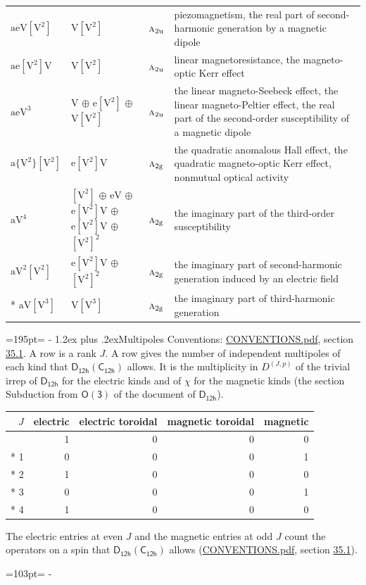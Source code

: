 \documentclass[10pt,a4paper]{article}
\makeatletter
\renewcommand\section{\@startsection{section}{1}{\z@}{-3ex plus -1ex minus -.2ex}%
  {1.2ex plus .2ex}{\normalfont\large\sffamily\bfseries\color{parttitle}}}
\newcommand{\needspace}[1]{\par\penalty-100\begingroup\dimen0=#1\relax\dimen2=\pagegoal
  \advance\dimen2-\pagetotal\ifdim\dimen0>\dimen2\relax\ifdim\dimen2>0pt\vfil\break\fi\fi
  \endgroup}
\numberwithin{equation}{section}
\newcommand{\grp}[1]{\mathsf{#1}}
\newcommand{\irr}[1]{\text{\normalfont\scshape #1}}
\newcommand{\ptag}[1]{\mathrm{#1}}
\newcommand{\irrJp}[2]{D^{(#1,#2)}}
\newcommand{\jahn}[1]{\mathrm{#1}}
\newlength{\fillwidth}\newlength{\cellwidth}\newlength{\colwidth}
\makeatother
\begin{document}
{\begin{longtable}{@{}lll>{\RaggedRight\arraybackslash}p{\fillwidth}@{}}
$\jahn{aeV[V^{2}]}$ & $\jahn{V[V^{2}]}$ & $\irr{a}_{2\ptag{u}}$ & piezomagnetism, the real part of second-harmonic generation by a magnetic dipole\\
$\jahn{ae[V^{2}]V}$ & $\jahn{V[V^{2}]}$ & $\irr{a}_{2\ptag{u}}$ & linear magnetoresistance, the magneto-optic Kerr effect\\
$\jahn{aeV^{3}}$ & $\jahn{V}$ $\oplus$ $\jahn{e[V^{2}]}$ $\oplus$ $\jahn{V[V^{2}]}$ & $\irr{a}_{2\ptag{u}}$ & the linear magneto-Seebeck effect, the linear magneto-Peltier effect, the real part of the second-order susceptibility of a magnetic dipole\\
$\jahn{a\{V^{2}\}[V^{2}]}$ & $\jahn{e[V^{2}]V}$ & $\irr{a}_{2\ptag{g}}$ & the quadratic anomalous Hall effect, the quadratic magneto-optic Kerr effect, nonmutual optical activity\\
$\jahn{aV^{4}}$ & $\jahn{[V^{2}]}$ $\oplus$ $\jahn{eV}$ $\oplus$ $\jahn{e[V^{2}]V}$ $\oplus$ $\jahn{e[V^{2}]V}$ $\oplus$ $\jahn{[V^{2}]^{2}}$ & $\irr{a}_{2\ptag{g}}$ & the imaginary part of the third-order susceptibility\\
$\jahn{aV^{2}[V^{2}]}$ & $\jahn{e[V^{2}]V}$ $\oplus$ $\jahn{[V^{2}]^{2}}$ & $\irr{a}_{2\ptag{g}}$ & the imaginary part of second-harmonic generation induced by an electric field\\*
$\jahn{aV[V^{3}]}$ & $\jahn{V[V^{3}]}$ & $\irr{a}_{2\ptag{g}}$ & the imaginary part of third-harmonic generation\\
\bottomrule\end{longtable}}
\needspace{195pt}
\section{Multipoles}\label{s:multipoles}
Conventions: \href{../../CONVENTIONS.pdf}{CONVENTIONS.pdf}, section \href{../../CONVENTIONS.pdf\#conv.35.1}{35.1}.
A row is a rank $J$. \label{n:head.multipole.electric}\label{n:head.multipole.electric.toroidal}\label{n:head.multipole.magnetic.toroidal}\label{n:head.multipole.magnetic}A row gives the number of independent multipoles of each kind that $\grp{D_{12h}}(\grp{C_{12h}})$ allows. It is the multiplicity in $\irrJp{J}{p}$ of the trivial irrep of $\grp{D_{12h}}$ for the electric kinds and of $\chi$ for the magnetic kinds (the section Subduction from $\grp{O(3)}$ of the document of \href{../../../rotation/data/pdf/D12h.pdf}{$\grp{D_{12h}}$}).
{\small\begin{longtable}{@{}rrrrr@{}}\toprule
$J$ & electric & electric toroidal & magnetic toroidal & magnetic\\\midrule\endhead
\bottomrule\endfoot\endlastfoot
0 & 1 & 0 & 0 & 0\\*
1 & 0 & 0 & 0 & 1\\*
2 & 1 & 0 & 0 & 0\\*
3 & 0 & 0 & 0 & 1\\*
4 & 1 & 0 & 0 & 0\\
\bottomrule\end{longtable}}
The electric entries at even $J$ and the magnetic entries at odd $J$ count the operators on a spin that $\grp{D_{12h}}(\grp{C_{12h}})$ allows (\href{../../CONVENTIONS.pdf}{CONVENTIONS.pdf}, section \href{../../CONVENTIONS.pdf\#conv.35.1}{35.1}).
\needspace{103pt}
\end{document}
